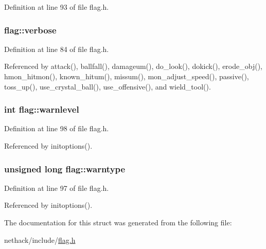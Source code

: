 Definition at line 93 of file flag.\+h.

\hypertarget{structflag_afd7dfe45d35356d861ab5e9834231929}{
\subsubsection[{verbose}]{ flag\+::verbose}}\label{structflag_afd7dfe45d35356d861ab5e9834231929}


Definition at line 84 of file flag.\+h.



Referenced by attack(), ballfall(), damageum(), do\+\_\+look(), dokick(), erode\+\_\+obj(), hmon\+\_\+hitmon(), known\+\_\+hitum(), missum(), mon\+\_\+adjust\+\_\+speed(), passive(), toss\+\_\+up(), use\+\_\+crystal\+\_\+ball(), use\+\_\+offensive(), and wield\+\_\+tool().

\hypertarget{structflag_ac1920376d9c18e4f6a1ab4441a5835f8}{
\subsubsection[{warnlevel}]{\setlength{\rightskip}{0pt plus 5cm}int flag\+::warnlevel}}\label{structflag_ac1920376d9c18e4f6a1ab4441a5835f8}


Definition at line 98 of file flag.\+h.



Referenced by initoptions().

\hypertarget{structflag_a8dd0a7f691a4ce435bdce865db7a120c}{
\subsubsection[{warntype}]{\setlength{\rightskip}{0pt plus 5cm}unsigned long flag\+::warntype}}\label{structflag_a8dd0a7f691a4ce435bdce865db7a120c}


Definition at line 97 of file flag.\+h.



Referenced by initoptions().



The documentation for this struct was generated from the following file\+:\begin{DoxyCompactItemize}
\item 
nethack/include/\hyperlink{flag_8h}{flag.\+h}\end{DoxyCompactItemize}
